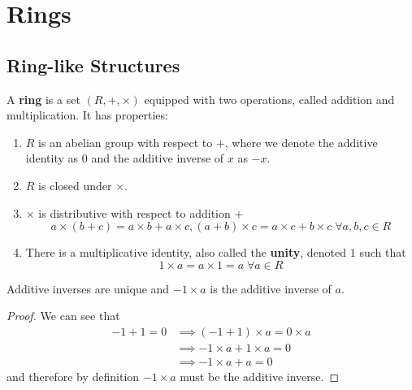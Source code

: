 \section{Rings}

\subsection{Ring-like Structures}

  \begin{definition}[Ring]
    A \textbf{ring} is a set $(R, +, \times)$ equipped with two operations, called addition and multiplication. It has properties: 
    \begin{enumerate}
      \item $R$ is an abelian group with respect to $+$, where we denote the additive identity as $0$ and the additive inverse of $x$ as $-x$. 
      \item $R$ is closed under $\times$.
      \item $\times$ is distributive with respect to addition $+$
        \begin{equation}
          a \times (b + c) = a\times b + a\times c, (a+b)\times c = a\times c + b\times c \; \forall a, b, c \in R
        \end{equation}
      \item There is a multiplicative identity, also called the \textbf{unity}, denoted $1$ such that 
        \begin{equation}
          1 \times a = a \times 1 = a \; \forall a \in R
        \end{equation}
    \end{enumerate}
  \end{definition}

  \begin{lemma} 
    Additive inverses are unique and $-1 \times a$ is the additive inverse of $a$. 
  \end{lemma}
  \begin{proof}
    We can see that 
    \begin{align}
      -1 + 1 = 0 & \implies (-1 + 1) \times a = 0 \times a \\
                 & \implies -1 \times a + 1 \times a = 0 \\
                 & \implies -1 \times a + a = 0 
    \end{align}
    and therefore by definition $-1 \times a$ must be the additive inverse. 
  \end{proof}

